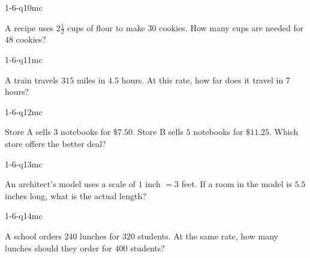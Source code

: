 \begin{practiceQuestion}{1-6-q10}{mc}
\begin{questionText}
A recipe uses $2\frac{1}{2}$ cups of flour to make $30$ cookies. How many cups are needed for $48$ cookies?
\end{questionText}
\end{practiceQuestion}

\begin{practiceQuestion}{1-6-q11}{mc}
\begin{questionText}
A train travels $315$ miles in $4.5$ hours. At this rate, how far does it travel in $7$ hours?
\end{questionText}
\end{practiceQuestion}

\begin{practiceQuestion}{1-6-q12}{mc}
\begin{questionText}
Store A sells $3$ notebooks for $\$7.50$. Store B sells $5$ notebooks for $\$11.25$. Which store offers the better deal?
\end{questionText}
\end{practiceQuestion}

\begin{practiceQuestion}{1-6-q13}{mc}
\begin{questionText}
An architect's model uses a scale of $1$ inch $= 3$ feet. If a room in the model is $5.5$ inches long, what is the actual length?
\end{questionText}
\end{practiceQuestion}

\begin{practiceQuestion}{1-6-q14}{mc}
\begin{questionText}
A school orders $240$ lunches for $320$ students. At the same rate, how many lunches should they order for $400$ students?
\end{questionText}
\end{practiceQuestion}

